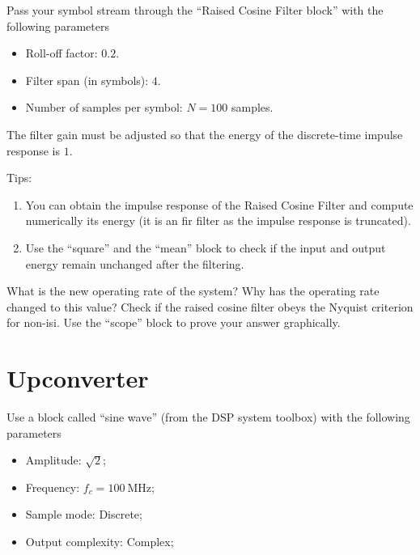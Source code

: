 \documentclass[12pt,a4paper]{article}
\begin{document}
\problem Pass your symbol stream through the ``Raised Cosine Filter block'' with the following parameters
\begin{itemize}
    \item Roll-off factor: \(0.2\).
    \item Filter span (in symbols): \(4\).
    \item Number of samples per symbol: \(N=100\) samples.
\end{itemize}
The filter gain must be adjusted so that the energy of the discrete-time impulse response is \(1\).

Tips:
\begin{enumerate}
    \item You can obtain the impulse response of the Raised Cosine Filter and compute numerically its energy (it is an \gls{fir} filter as the impulse response is truncated).
    \item Use the ``square'' and the ``mean'' block to check if the input and output energy remain unchanged after the filtering.
\end{enumerate}
\subproblem What is the new operating rate of the system? Why has the operating rate changed to this value?
\subproblem Check if the raised cosine filter obeys the Nyquist criterion for non-\gls{isi}. Use the ``scope'' block to prove your answer graphically.

\section{Upconverter}

\problem Use a block called ``sine wave'' (from the DSP system toolbox) with the following parameters
\begin{itemize}
    \item Amplitude: \(\sqrt{2}\);
    \item Frequency: \(f_c = \qty{100}{\mega\hertz}\);
    \item Sample mode: Discrete;
    \item Output complexity: Complex;
\end{itemize}
\end{document}
